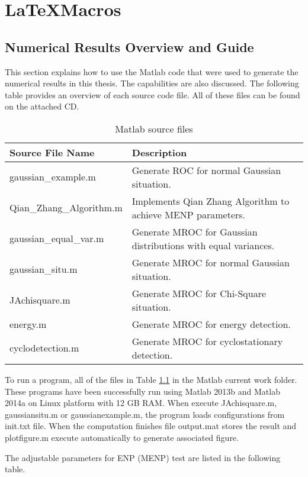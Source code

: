 \resetdatestamp

\chapter{\LaTeX{}Macros}
\label{A:LaTeXmacros}

\section{Numerical Results Overview and Guide }
This section explains how to use the Matlab code that were used to generate the numerical results in this thesis. The capabilities are also discussed. The following table provides an overview of each source code file. All of these files can be found on the attached CD. 

\begin{table}[h]
\begin{tabular}{ll}
\hline
\hline
Source File Name                  & Description                                                                \\ \hline
gaussian\_example.m      & Generate ROC for normal Gaussian situation.              \\
Qian\_Zhang\_Algorithm.m & Implements Qian Zhang Algorithm to achieve MENP parameters.                \\
gaussian\_equal\_var.m   & Generate MROC for Gaussian distributions with equal variances. \\
gaussian\_situ.m         & Generate MROC for normal Gaussian situation.                   \\
JAchisquare.m            & Generate MROC for Chi-Square situation.                        \\
energy.m                 & Generate MROC for energy detection.                            \\
cyclodetection.m         & Generate MROC for cyclostationary detection.                 \\ 
\hline
\end{tabular}
\label{filelist}
\caption{Matlab source files}
\end{table}

To run a program, all of the files in Table \ref{filelist} in the Matlab current work folder. These programs have been successfully run using Matlab 2013b and Matlab 2014a on Linux platform with 12 GB RAM.  When execute JAchisquare.m, gaussiansitu.m or gaussianexample.m, the program loads configurations from init.txt file. When the computation finishes file output.mat stores the result and plotfigure.m execute automatically to generate associated figure. 

The adjustable parameters for ENP (MENP) test are listed in the following table. 
